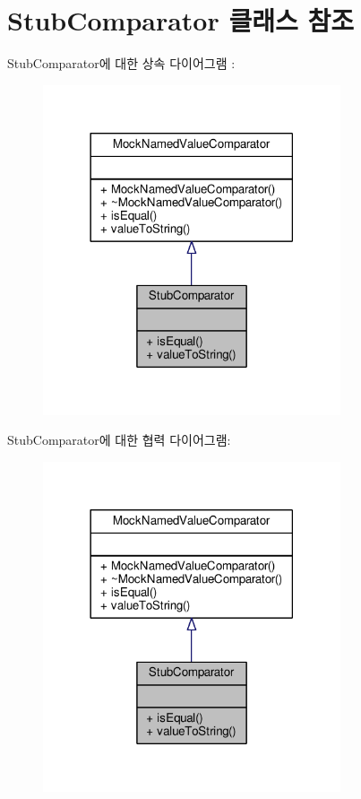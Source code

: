 \hypertarget{class_stub_comparator}{}\section{Stub\+Comparator 클래스 참조}
\label{class_stub_comparator}


Stub\+Comparator에 대한 상속 다이어그램 \+: 
\nopagebreak
\begin{figure}[H]
\begin{center}
\leavevmode
\includegraphics[width=249pt]{class_stub_comparator__inherit__graph}
\end{center}
\end{figure}


Stub\+Comparator에 대한 협력 다이어그램\+:
\nopagebreak
\begin{figure}[H]
\begin{center}
\leavevmode
\includegraphics[width=249pt]{class_stub_comparator__coll__graph}
\end{center}
\end{figure}
